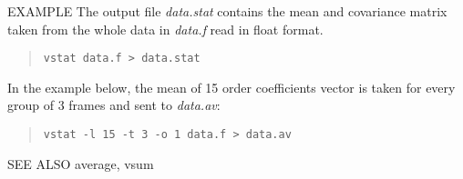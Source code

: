 \begin{qsection}{EXAMPLE}
The output file {\em data.stat} contains the mean and covariance matrix
taken from the whole data in {\em data.f} read in float format.
\begin{quote}
  \verb!vstat data.f > data.stat!
\end{quote}

In the example below, the mean of 15 order coefficients vector is taken
for every group of 3 frames and sent to {\em data.av}:
\begin{quote}
  \verb!vstat -l 15 -t 3 -o 1 data.f > data.av!
\end{quote}
\end{qsection}

\begin{qsection}{SEE ALSO}
  average, vsum
\end{qsection}
